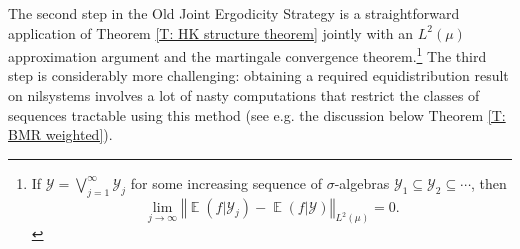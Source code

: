 \documentclass[11pt]{amsart}
\theoremstyle{definition}
\DeclareMathOperator*{\E}{\mathbb{E}}
\newcommand{\N}{{\mathbb N}}
\newcommand{\CY}{{\mathcal Y}}
\newcommand{\norm}[1]{\left\Vert #1\right\Vert}
\newcommand{\nnorm}[1]{\lvert\!|\!| #1|\!|\!\rvert}
\newcommand{\1}{{\mathbf{1}}}
\newcommand{\abs}[1]{\mathopen{}\left| #1\mathclose{}\right|}
\newcommand{\BK}[1]{{\color{Apricot}{{#1}}}}
\begin{document}
    


The second step in the Old Joint Ergodicity Strategy is a straightforward application of Theorem \ref{T: HK structure theorem} jointly with an $L^2(\mu)$ approximation argument and the martingale convergence theorem.\footnote{If $\CY = \bigvee_{j=1}^\infty \CY_j$ for some increasing sequence of $\sigma$-algebras $\CY_1\subseteq \CY_2\subseteq \cdots$, then $$\lim\limits_{j\to\infty}\norm{\E(f|\CY_j)-\E(f|\CY)}_{L^2(\mu)} = 0.$$} The third step is considerably more challenging: obtaining a required equidistribution result on nilsystems involves a lot of nasty computations that restrict the classes of sequences tractable using this method (see e.g. the discussion below Theorem \ref{T: BMR weighted}).
\end{document}
